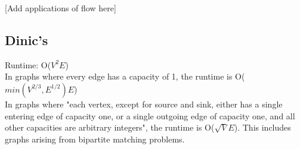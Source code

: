 
[Add applications of flow here]

\subsection*{Dinic's}

Runtime: O($V^2 E$) \\
\indent In graphs where every edge has a capacity of 1, the runtime is O($min(V^{2/3}, E^{1/2}) E$) \\
\indent In graphs where "each vertex, except for source and sink, either has a single entering edge of capacity one, or a single outgoing edge of capacity one, and all other capacities are arbitrary integers", the runtime is O($\sqrt{V} E$). This includes graphs arising from bipartite matching problems.



\newpage